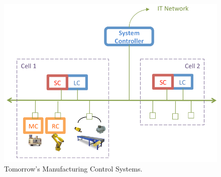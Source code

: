\begin{figure}[htb]
\small
\centering
\includegraphics[width=0.95\columnwidth]{Figures/mfg-today.pdf}
\vspace{-\baselineskip}
\caption{Tomorrow's Manufacturing Control Systems.}%
\label{fig::today}
\vspace{-\baselineskip}
\end{figure}
